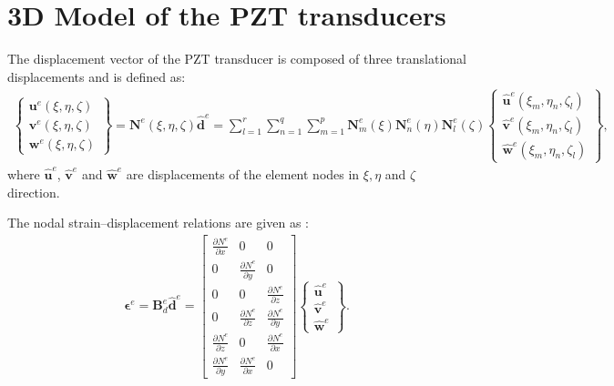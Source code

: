 \section{3D Model of the PZT transducers}
\label{sec:3Dpzt}



The displacement vector of the PZT transducer is composed of three translational displacements and  is defined as:
\begin{eqnarray}
	\left \{ \begin{array}{c}
		\textbf{u}^e(\xi,\eta,\zeta) \\
		\textbf{v}^e(\xi,\eta,\zeta) \\
		\textbf{w}^e(\xi,\eta,\zeta)
	\end{array} \right\}
	= \textbf{N}^e(\xi,\eta, \zeta)\widehat{\textbf{d}}^e
	= \sum_{l=1}^r\sum_{n=1}^q\sum_{m=1}^p\textbf{N}_m^e(\xi)\textbf{N}_n^e(\eta)\textbf{N}_l^e(\zeta)
	\left \{ \begin{array}{c}
		\widehat{\textbf{u}}^e(\xi_m,\eta_n,\zeta_l) \\
		\widehat{\textbf{v}}^e(\xi_m,\eta_n,\zeta_l) \\
		\widehat{\textbf{w}}^e(\xi_m,\eta_n,\zeta_l)
	\end{array} \right\},
	\label{eq:3D_displ}
\end{eqnarray}
where \(\widehat{\textbf{u}}^e\), \(\widehat{\textbf{v}}^e\) and 
\(\widehat{\textbf{w}}^e\) are displacements of the element nodes in \(\xi,\eta\) and \(\zeta\) direction.

The nodal strain--displacement relations are given as \cite{kudela20093d}:
\begin{eqnarray}
	\boldsymbol{\epsilon}^e=\textbf{B}_{d}^e\widehat{\textbf{d}}^e=
	\left [
	\begin{array}{ccc}
		\frac{\partial N^e}{\partial x} & 0 & 0\\
		0 & \frac{\partial N^e}{\partial y} & 0\\
		0 & 0 & \frac{\partial N^e}{\partial z}\\
		0 & \frac{\partial N^e}{\partial z} & \frac{\partial N^e}{\partial y}\\
		\frac{\partial N^e}{\partial z} & 0 & \frac{\partial N^e}{\partial x}\\
		\frac{\partial N^e}{\partial y} & \frac{\partial N^e}{\partial x} & 0
	\end{array} \right]
	\left \{ \begin{array}{c}
		\widehat{\textbf{u}}^e \\
		\widehat{\textbf{v}}^e \\
		\widehat{\textbf{w}}^e
	\end{array} \right\}.
\end{eqnarray}

